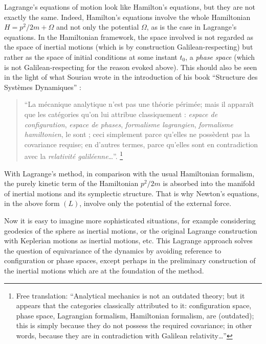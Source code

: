  Lagrange's equations of motion look like Hamilton's equations,
but they are not exactly the same.
Indeed,
Hamilton's equations involve the whole Hamiltonian $H = p^2 / 2m + \Omega$ and not only the potential $\Omega$,
as is the case in Lagrange's equations.
In the Hamiltonian framework,
the space involved is not regarded as the space of inertial motions
(which is by construction Galilean-respecting)
but rather as the space of initial conditions at some instant $t_0$, a {\em phase space}
(which is not Galilean-respecting for the reason evoked above). This should also be seen in the light of what Souriau
wrote in the introduction of his book ``Structure des Systèmes Dynamiques'' \cite{Sou70}:

\begin{quote}``La mécanique analytique n'est pas une théorie périmée; mais
  il apparaît que les catégories qu'on lui attribue classiquement :
  {\em espace de configuration}, {\em espace de phases}, {\em formalisme lagrangien},
  {\em formalisme hamiltonien}, le sont ; ceci simplement parce qu'elles ne
  possèdent pas la covariance requise; en d'autres termes, parce
  qu'elles sont en contradiction avec la {\em relativité galiléenne}\dots''.%
  \footnote{Free translation: ``Analytical mechanics is not an outdated theory;
  but it appears that the categories classically attributed to it:
  configuration space,
  phase space,
  Lagrangian formalism,
  Hamiltonian formalism,
  are (outdated);
  this is simply because they do not possess the required covariance;
  in other words,
  because they are in contradiction with Galilean relativity\dots''
  }
\end{quote}

With Lagrange's method, in comparison with the usual Hamiltonian formalism,
the purely kinetic term of the Hamiltonian $p^2/2m$ is absorbed into the manifold of inertial motions
and its symplectic structure. That is why Newton's equations, in the above form $(L)$,
involve only the potential of the external force.

 Now it is easy to imagine more sophisticated situations, for example considering geodesics
of the sphere as inertial motions, or the original Lagrange construction with
Keplerian motions as inertial motions, etc. This Lagrange approach solves the question of equivariance
of the dynamics by avoiding reference to configuration or phase spaces, except perhaps in
the preliminary construction of the inertial motions which are at the foundation
of the method.

